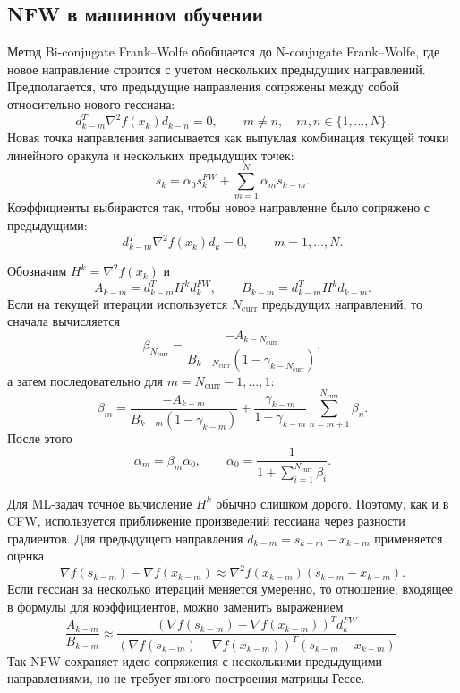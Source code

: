 \subsection{NFW в машинном обучении}

Метод Bi-conjugate Frank--Wolfe обобщается до N-conjugate Frank--Wolfe, где новое
направление строится с учетом нескольких предыдущих направлений.
Предполагается, что предыдущие направления сопряжены между собой относительно нового
гессиана:
\[
    d_{k-m}^T\nabla^2f(x_k)d_{k-n}=0,
    \qquad
    m\neq n,\quad m,n\in\{1,\ldots,N\}.
\]
Новая точка направления записывается как выпуклая комбинация текущей точки линейного
оракула и нескольких предыдущих точек:
\[
    s_k
    =
    \alpha_0s_k^{FW}
    +
    \sum_{m=1}^{N}\alpha_ms_{k-m}.
\]
Коэффициенты выбираются так, чтобы новое направление было сопряжено с предыдущими:
\[
    d_{k-m}^T\nabla^2f(x_k)d_k=0,
    \qquad m=1,\ldots,N.
\]

Обозначим $H^k=\nabla^2f(x_k)$ и
\[
    A_{k-m}=d_{k-m}^TH^kd_k^{FW},
    \qquad
    B_{k-m}=d_{k-m}^TH^kd_{k-m}.
\]
Если на текущей итерации используется $N_{\mathrm{curr}}$ предыдущих направлений, то
сначала вычисляется
\[
    \beta_{N_{\mathrm{curr}}}
    =
    \frac{-A_{k-N_{\mathrm{curr}}}}
    {B_{k-N_{\mathrm{curr}}}(1-\gamma_{k-N_{\mathrm{curr}}})},
\]
а затем последовательно для $m=N_{\mathrm{curr}}-1,\ldots,1$:
\[
    \beta_m
    =
    \frac{-A_{k-m}}{B_{k-m}(1-\gamma_{k-m})}
    +
    \frac{\gamma_{k-m}}{1-\gamma_{k-m}}
    \sum_{n=m+1}^{N_{\mathrm{curr}}}\beta_n.
\]
После этого
\[
    \alpha_m=\beta_m\alpha_0,
    \qquad
    \alpha_0=
    \frac{1}{1+\sum_{i=1}^{N_{\mathrm{curr}}}\beta_i}.
\]

Для ML-задач точное вычисление $H^k$ обычно слишком дорого.
Поэтому, как и в CFW, используется приближение произведений гессиана через разности
градиентов.
Для предыдущего направления $d_{k-m}=s_{k-m}-x_{k-m}$ применяется оценка
\[
    \nabla f(s_{k-m})-\nabla f(x_{k-m})
    \approx
    \nabla^2f(x_{k-m})(s_{k-m}-x_{k-m}).
\]
Если гессиан за несколько итераций меняется умеренно, то отношение, входящее в формулы
для коэффициентов, можно заменить выражением
\[
    \frac{A_{k-m}}{B_{k-m}}
    \approx
    \frac{
        (\nabla f(s_{k-m})-\nabla f(x_{k-m}))^Td_k^{FW}
    }{
        (\nabla f(s_{k-m})-\nabla f(x_{k-m}))^T(s_{k-m}-x_{k-m})
    }.
\]
Так NFW сохраняет идею сопряжения с несколькими предыдущими направлениями, но не требует
явного построения матрицы Гессе.

